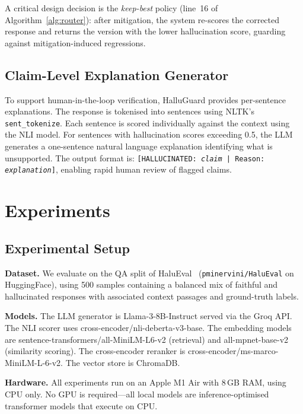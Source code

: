 \documentclass[conference]{IEEEtran}
\begin{document}
A critical design decision is the \textit{keep-best} policy (line~16 of Algorithm~\ref{alg:router}): after mitigation, the system re-scores the corrected response and returns the version with the lower hallucination score, guarding against mitigation-induced regressions.

\subsection{Claim-Level Explanation Generator}

To support human-in-the-loop verification, HalluGuard provides per-sentence explanations. The response is tokenised into sentences using NLTK's \texttt{sent\_tokenize}. Each sentence is scored individually against the context using the NLI model. For sentences with hallucination scores exceeding 0.5, the LLM generates a one-sentence natural language explanation identifying what is unsupported. The output format is: \texttt{[HALLUCINATED: \textit{claim} | Reason: \textit{explanation}]}, enabling rapid human review of flagged claims.

\section{Experiments}

\subsection{Experimental Setup}

\textbf{Dataset.} We evaluate on the QA split of HaluEval~\cite{li2023halueval} (\texttt{pminervini/HaluEval} on HuggingFace), using 500 samples containing a balanced mix of faithful and hallucinated responses with associated context passages and ground-truth labels.

\textbf{Models.} The LLM generator is Llama-3-8B-Instruct served via the Groq API. The NLI scorer uses cross-encoder/nli-deberta-v3-base. The embedding models are sentence-transformers/all-MiniLM-L6-v2 (retrieval) and all-mpnet-base-v2 (similarity scoring). The cross-encoder reranker is cross-encoder/ms-marco-MiniLM-L-6-v2. The vector store is ChromaDB.

\textbf{Hardware.} All experiments run on an Apple M1 Air with 8\,GB RAM, using CPU only. No GPU is required---all local models are inference-optimised transformer models that execute on CPU.
\end{document}
